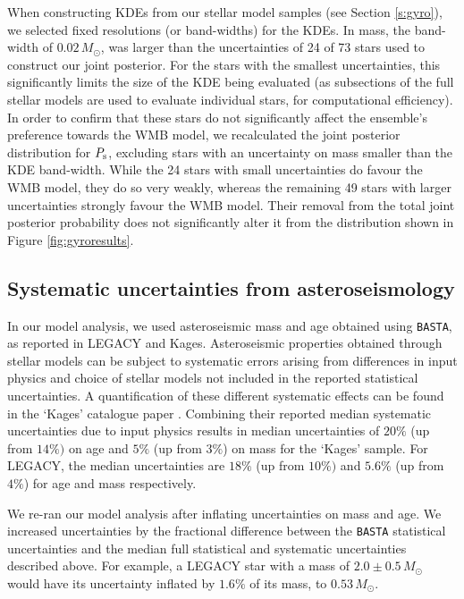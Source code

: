 When constructing KDEs from our stellar model samples (see Section \ref{s:gyro}), we selected fixed resolutions (or band-widths) for the KDEs. In mass, the band-width of $0.02\, M_\odot$, was larger than the uncertainties of 24 of 73 stars used to construct our joint posterior. For the stars with the smallest uncertainties, this significantly limits the size of the KDE being evaluated (as subsections of the full stellar models are used to evaluate individual stars, for computational efficiency). In order to confirm that these stars do not significantly affect the ensemble's preference towards the WMB model, we recalculated the joint posterior distribution for $P_{\rm s}$, excluding stars with an uncertainty on mass smaller than the KDE band-width. While the 24 stars with small uncertainties do favour the WMB model, they do so very weakly, whereas the remaining 49 stars with larger uncertainties strongly favour the WMB model. Their removal from the total joint posterior probability does not significantly alter it from the distribution shown in Figure \ref{fig:gyroresults}.

\subsection{Systematic uncertainties from asteroseismology}
In our model analysis, we used asteroseismic mass and age obtained using \texttt{BASTA}, as reported in LEGACY and Kages. Asteroseismic properties obtained through stellar models can be subject to systematic errors arising from differences in input physics and choice of stellar models not included in the reported statistical uncertainties. A quantification of these different systematic effects can be found in the `Kages' catalogue paper \cite{m_silvaaguirre+2015}. Combining their reported median systematic uncertainties due to input physics results in median uncertainties of $20\%$ (up from $14\%)$ on age and $5\%$ (up from $3\%$) on mass for the `Kages' sample. For LEGACY, the median uncertainties are $18\%$ (up from $10\%)$ and $5.6\%$ (up from $4\%$) for age and mass respectively.

We re-ran our model analysis after inflating uncertainties on mass and age. We increased uncertainties by the fractional difference between the \texttt{BASTA} statistical uncertainties and the median full statistical and systematic uncertainties described above. For example, a LEGACY star with a mass of $2.0 \pm 0.5\, M_\odot$ would have its uncertainty inflated by $1.6\%$ of its mass, to $0.53\, M_\odot$. 

